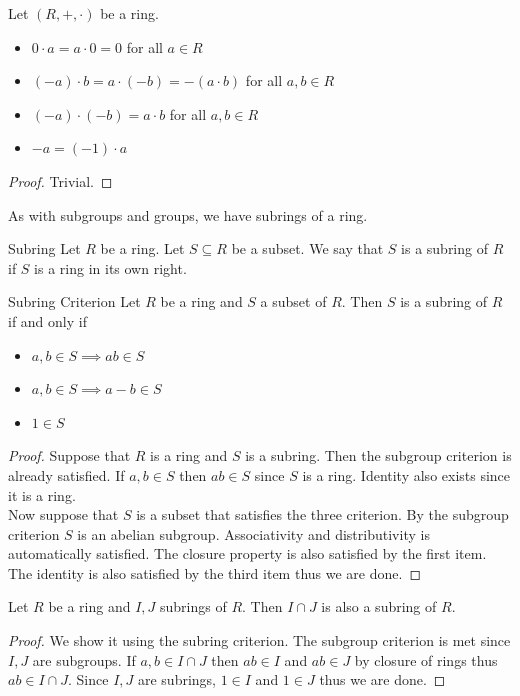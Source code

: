 \documentclass[a4paper]{article}
\begin{document}
\begin{lmm}{}{} Let $(R,+,\cdot)$ be a ring. 
\begin{itemize}
\item $0\cdot a=a\cdot 0=0$ for all $a\in R$
\item $(-a)\cdot b=a\cdot (-b)=-(a\cdot b)$ for all $a,b\in R$
\item $(-a)\cdot (-b)=a\cdot b$ for all $a,b\in R$
\item $-a=(-1)\cdot a$
\end{itemize}
\begin{proof}
Trivial. 
\end{proof}
\end{lmm}

As with subgroups and groups, we have subrings of a ring. 

\begin{defn}{Subring}{} Let $R$ be a ring. Let $S\subseteq R$ be a subset. We say that $S$ is a subring of $R$ if $S$ is a ring in its own right. 
\end{defn}

\begin{prp}{Subring Criterion}{} Let $R$ be a ring and $S$ a subset of $R$. Then $S$ is a subring of $R$ if and only if 
\begin{itemize}
\item $a,b\in S\implies ab\in S$
\item $a,b\in S\implies a-b\in S$
\item $1\in S$
\end{itemize}
\begin{proof}
Suppose that $R$ is a ring and $S$ is a subring. Then the subgroup criterion is already satisfied. If $a,b\in S$ then $ab\in S$ since $S$ is a ring. Identity also exists since it is a ring. \\
Now suppose that $S$ is a subset that satisfies the three criterion. By the subgroup criterion $S$ is an abelian subgroup. Associativity and distributivity is automatically satisfied. The closure property is also satisfied by the first item. The identity is also satisfied by the third item thus we are done. 
\end{proof}
\end{prp}

\begin{prp}{}{} Let $R$ be a ring and $I,J$ subrings of $R$. Then $I\cap J$ is also a subring of $R$. 
\begin{proof}
We show it using the subring criterion. The subgroup criterion is met since $I,J$ are subgroups. If $a,b\in I\cap J$ then $ab\in I$ and $ab\in J$ by closure of rings thus $ab\in I\cap J$. Since $I,J$ are subrings, $1\in I$ and $1\in J$ thus we are done. 
\end{proof}
\end{prp}
\end{document}
